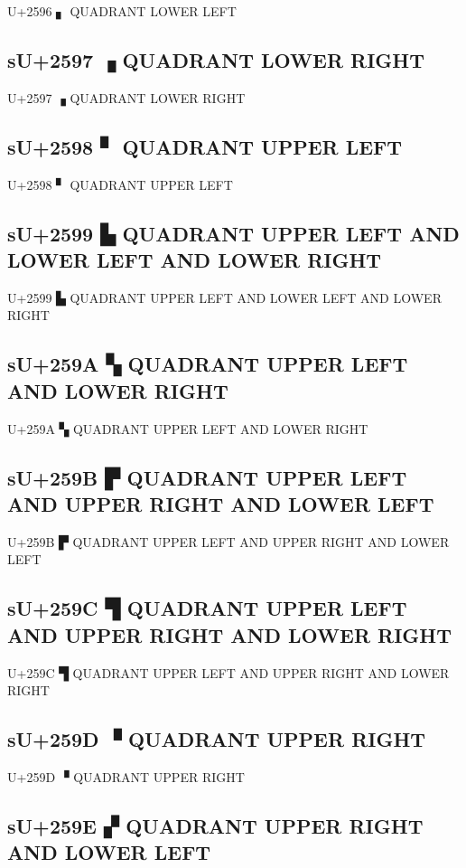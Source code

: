 U+2596 ▖ QUADRANT LOWER LEFT

\subsection{sU+2597 ▗ QUADRANT LOWER RIGHT}

U+2597 ▗ QUADRANT LOWER RIGHT

\subsection{sU+2598 ▘ QUADRANT UPPER LEFT}

U+2598 ▘ QUADRANT UPPER LEFT

\subsection{sU+2599 ▙ QUADRANT UPPER LEFT AND LOWER LEFT AND LOWER RIGHT}

U+2599 ▙ QUADRANT UPPER LEFT AND LOWER LEFT AND LOWER RIGHT

\subsection{sU+259A ▚ QUADRANT UPPER LEFT AND LOWER RIGHT}

U+259A ▚ QUADRANT UPPER LEFT AND LOWER RIGHT

\subsection{sU+259B ▛ QUADRANT UPPER LEFT AND UPPER RIGHT AND LOWER LEFT}

U+259B ▛ QUADRANT UPPER LEFT AND UPPER RIGHT AND LOWER LEFT

\subsection{sU+259C ▜ QUADRANT UPPER LEFT AND UPPER RIGHT AND LOWER RIGHT}

U+259C ▜ QUADRANT UPPER LEFT AND UPPER RIGHT AND LOWER RIGHT

\subsection{sU+259D ▝ QUADRANT UPPER RIGHT}

U+259D ▝ QUADRANT UPPER RIGHT

\subsection{sU+259E ▞ QUADRANT UPPER RIGHT AND LOWER LEFT}

